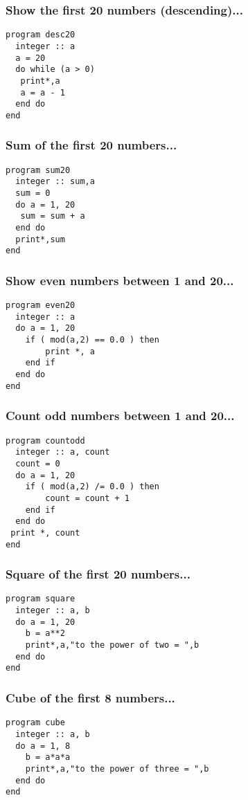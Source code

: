 \documentclass[xcolor=dvipsnames,dvip,notes=show,table]{beamer}
\begin{document}
\begin{frame}[fragile]
\frametitle{Show the first 20 numbers (descending)...}

\scriptsize
\begin{lstlisting}
program desc20
  integer :: a
  a = 20
  do while (a > 0) 
   print*,a
   a = a - 1
  end do
end
\end{lstlisting}
\end{frame}


\begin{frame}[fragile]
\frametitle{Sum of the first 20 numbers...}

\scriptsize
\begin{lstlisting}
program sum20
  integer :: sum,a
  sum = 0
  do a = 1, 20
   sum = sum + a    
  end do
  print*,sum
end
\end{lstlisting}
\end{frame}


\begin{frame}[fragile]
\frametitle{Show even numbers between 1 and 20...}

\scriptsize
\begin{lstlisting}
program even20
  integer :: a
  do a = 1, 20
    if ( mod(a,2) == 0.0 ) then 
    	print *, a
    end if	
  end do
end
\end{lstlisting}
\end{frame}

\begin{frame}[fragile]
\frametitle{Count odd numbers between 1 and 20...}

\scriptsize
\begin{lstlisting}
program countodd
  integer :: a, count
  count = 0
  do a = 1, 20
    if ( mod(a,2) /= 0.0 ) then 
    	count = count + 1 
    end if	
  end do
 print *, count 
end
\end{lstlisting}
\end{frame}


\begin{frame}[fragile]
\frametitle{Square of the first 20 numbers...}

\scriptsize
\begin{lstlisting}
program square
  integer :: a, b
  do a = 1, 20
    b = a**2
    print*,a,"to the power of two = ",b
  end do
end
\end{lstlisting}
\end{frame}

\begin{frame}[fragile]
\frametitle{Cube of the first 8 numbers...}

\scriptsize
\begin{lstlisting}
program cube
  integer :: a, b
  do a = 1, 8
    b = a*a*a
    print*,a,"to the power of three = ",b
  end do
end
\end{lstlisting}
\end{frame}
\end{document}

